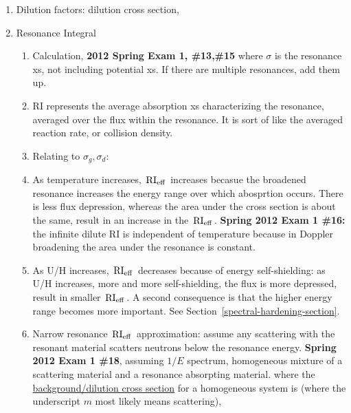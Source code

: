 \documentclass{school-22.211-notes}
\begin{document}
\begin{enumerate}
\begin{enumerate}
    \item Dilution factors: dilution cross section, 



    \item Resonance Integral
      \begin{enumerate}
      \item Calculation, \textbf{2012 Spring Exam 1, \#13,\#15}
        where $\sigma$ is the resonance xs, not including potential xs. If there are multiple resonances, add them up. 

      \item RI represents the average absorption xs characterizing the resonance, averaged over the flux within the resonance. It is sort of like the averaged reaction rate, or collision density. 
        
      \item Relating to $\sigma_g, \sigma_d$: 

      \item As temperature increases, $\left. \mathrm{RI}_{\mathrm{eff}} \right.$ increases becasue the broadened resonance increases the energy range over which abosprtion occurs. There is less flux depression, whereas the area under the cross section is about the same, result in an increase in the $\left. \mathrm{RI}_{\mathrm{eff}} \right.$. \textbf{Spring 2012 Exam 1 \#16:} the infinite dilute RI is independent of temperature because in Doppler broadening the area under the resonance is constant. 

      \item As U/H increases, $\left. \mathrm{RI}_{\mathrm{eff}} \right.$ decreases because of energy self-shielding: as U/H increases, more and more self-shielding, the flux is more depressed, result in smaller $\left. \mathrm{RI}_{\mathrm{eff}} \right.$. A second consequence is that the higher energy range becomes more important. See Section~\ref{spectral-hardening-section}. 

      \item Narrow resonance $\left. \mathrm{RI}_{\mathrm{eff}} \right.$ approximation: assume any scattering with the resonant material scatters neutrons below the resonance energy. 
        \textbf{Spring 2012 Exam 1 \#18}, assuming $1/E$ spectrum, homogeneous mixture of a scattering material and a resonance absorpting material. 
        where the \uline{background/dilution cross section} for a homogeneous system is (where the underscript $m$ most likely means scattering), 
        

\end{enumerate}
\end{enumerate}
\end{enumerate}
\end{document}
